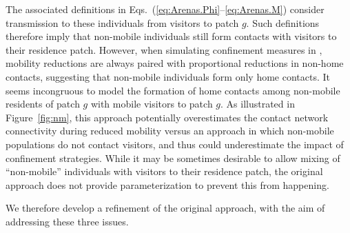 \begin{enumerate}
  The associated definitions in Eqs.~(\ref{eq:Arenas.Phi}--\ref{eq:Arenas.M})
  consider transmission to these individuals from visitors to patch $g$.
  Such definitions therefore imply that
  non-mobile individuals still form contacts with visitors to their residence patch.
  However, when simulating confinement measures in \cite{Arenas2020},
  mobility reductions are always paired with proportional reductions in non-home contacts,
  suggesting that non-mobile individuals form only home contacts.
  It seems incongruous to model the formation of
  home contacts among non-mobile residents of patch $g$ with mobile visitors to patch $g$.
  As illustrated in Figure~\ref{fig:nm}, this approach potentially
  overestimates the contact network connectivity during reduced mobility
  versus an approach in which non-mobile populations do not contact visitors,
  and thus could underestimate the impact of confinement strategies.
  While it may be sometimes desirable to allow mixing of ``non-mobile'' individuals
  with visitors to their residence patch,
  the original approach does not provide parameterization to prevent this from happening.
\end{enumerate}
We therefore develop a refinement of the original approach,
with the aim of addressing these three issues.
